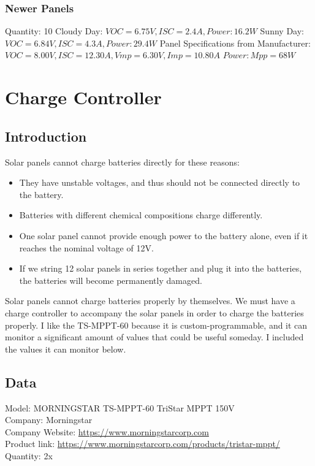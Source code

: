 \subsubsection{Newer Panels}
Quantity: 10
Cloudy Day:
$VOC = 6.75V, ISC = 2.4A, Power: 16.2W$
Sunny Day:
$VOC = 6.84V, ISC = 4.3A, Power: 29.4W$
Panel Specifications from Manufacturer:
$VOC = 8.00V, ISC = 12.30A, Vmp = 6.30V, Imp = 10.80A$
$Power: Mpp = 68W$


\section{Charge Controller}
\subsection{Introduction}

Solar panels cannot charge batteries directly for these reasons: 
\begin{itemize}
	\item They have unstable voltages, and thus should not be connected directly to the battery. 
	\item Batteries with different chemical compositions charge differently. 
	\item One solar panel cannot provide enough power to the battery alone, even if it reaches the nominal voltage of 12V. 
	\item If we string 12 solar panels in series together and plug it into the batteries, the batteries will become permanently damaged.
\end{itemize}

Solar panels cannot charge batteries properly by themselves. We must have a charge controller to accompany the solar panels in order to charge the batteries properly. I like the TS-MPPT-60 because it is custom-programmable, and it can monitor a significant amount of values that could be useful someday. I included the values it can monitor below.

\subsection{Data}
Model: MORNINGSTAR TS-MPPT-60 TriStar MPPT 150V\\
Company: Morningstar\\
Company Website: \href{https://www.morningstarcorp.com}{https://www.morningstarcorp.com}\\
Product link: \href{https://www.morningstarcorp.com/products/tristar-mppt/}{https://www.morningstarcorp.com/products/tristar-mppt/}\\
Quantity: 2x\\
